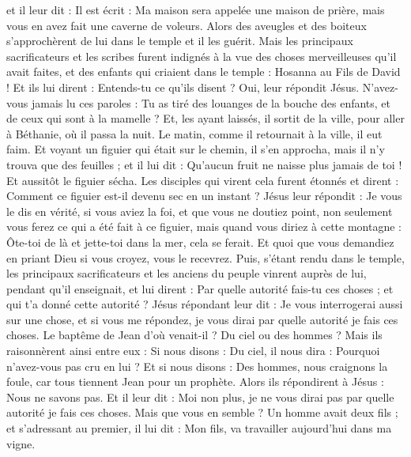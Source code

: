 \begin{multicols}{2}
et il leur dit : Il est écrit : Ma maison sera appelée une maison de prière, mais vous en avez fait une caverne de voleurs.
Alors des aveugles et des boiteux s'approchèrent de lui dans le temple et il les guérit.
Mais les principaux sacrificateurs et les scribes furent indignés à la vue des choses merveilleuses qu'il avait faites, et des enfants qui criaient dans le temple : Hosanna au Fils de David !
Et ils lui dirent : Entends-tu ce qu'ils disent ? Oui, leur répondit Jésus. N'avez-vous jamais lu ces paroles : Tu as tiré des louanges de la bouche des enfants, et de ceux qui sont à la mamelle ?
Et, les ayant laissés, il sortit de la ville, pour aller à Béthanie, où il passa la nuit.
Le matin, comme il retournait à la ville, il eut faim.
Et voyant un figuier qui était sur le chemin, il s'en approcha, mais il n'y trouva que des feuilles ; et il lui dit : Qu'aucun fruit ne naisse plus jamais de toi ! Et aussitôt le figuier sécha.
Les disciples qui virent cela furent étonnés et dirent : Comment ce figuier est-il devenu sec en un instant ?
Jésus leur répondit : Je vous le dis en vérité, si vous aviez la foi, et que vous ne doutiez point, non seulement vous ferez ce qui a été fait à ce figuier, mais quand vous diriez à cette montagne : Ôte-toi de là et jette-toi dans la mer, cela se ferait.
Et quoi que vous demandiez en priant Dieu si vous croyez, vous le recevrez.
Puis, s'étant rendu dans le temple, les principaux sacrificateurs et les anciens du peuple vinrent auprès de lui, pendant qu'il enseignait, et lui dirent : Par quelle autorité fais-tu ces choses ; et qui t'a donné cette autorité ?
Jésus répondant leur dit : Je vous interrogerai aussi sur une chose, et si vous me répondez, je vous dirai par quelle autorité je fais ces choses.
Le baptême de Jean d'où venait-il ? Du ciel ou des hommes ? Mais ils raisonnèrent ainsi entre eux : Si nous disons : Du ciel, il nous dira : Pourquoi n'avez-vous pas cru en lui ?
Et si nous disons : Des hommes, nous craignons la foule, car tous tiennent Jean pour un prophète.
Alors ils répondirent à Jésus : Nous ne savons pas. Et il leur dit : Moi non plus, je ne vous dirai pas par quelle autorité je fais ces choses.
Mais que vous en semble ? Un homme avait deux fils ; et s'adressant au premier, il lui dit : Mon fils, va travailler aujourd'hui dans ma vigne.

\end{multicols}
